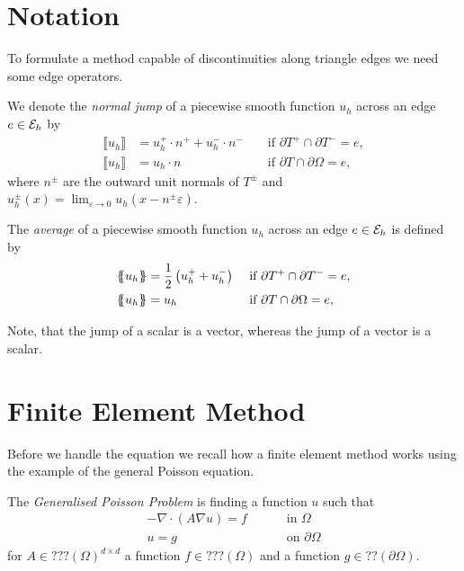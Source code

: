 \section{Notation}

To formulate a method capable of discontinuities along triangle edges we need some edge operators.   

\begin{definition}
We denote the \emph{normal jump} of  a piecewise smooth function $u_h$ across an edge $e \in \mathcal{E}_h$ by
\begin{align*}
	\llbracket u_h \rrbracket &= u_h^+ \cdot n^+ + u_h^-\cdot n^-  &&\text{ if } \partial T^+ \cap \partial T^- = e, \\
	\llbracket u_h \rrbracket &= u_h \cdot n  &&\text{ if } \partial T \cap \partial \Omega = e,
\end{align*}
where $n^\pm$ are the outward unit normals of $T^\pm$ and  $u_h^\pm(x) = \lim_{\varepsilon \rightarrow 0} u_h(x-n^\pm \varepsilon)$.

The \emph{average} of a piecewise smooth function $u_h$ across an edge $e \in \mathcal{E}_h$ is defined by
\begin{align*}
	\laverage u_h \raverage &= \frac 1 2 \left(u_h^+ + u_h^-\right) &&\text{ if } \partial T^+ \cap \partial T^- = e, \\
	\laverage u_h  \raverage &= u_h &&\text{ if } \partial T \cap \partial \Omega = e,
\end{align*}
\end{definition}

Note, that the jump of a scalar is a vector, whereas the jump of a vector is a scalar.


\section{Finite Element Method}
Before we handle the \MA equation we recall how a finite element method works using the example of the general Poisson equation. 


\begin{definition}
The \emph{Generalised Poisson Problem} is finding a function $u$ such that 
\begin{align}
	-\nabla \cdot (A \nabla u) = f \qquad &\text{ in }\Omega \label{eq: poisson eq} \\
	u = g \qquad &\text{ on } \partial \Omega    \label{eq: poisson bc}
\end{align}
for $ A \in ???(\Omega)^{d \times d}$ a function $f \in ???(\Omega)$ and a function $g \in ??(\partial \Omega)$. 
\end{definition}

